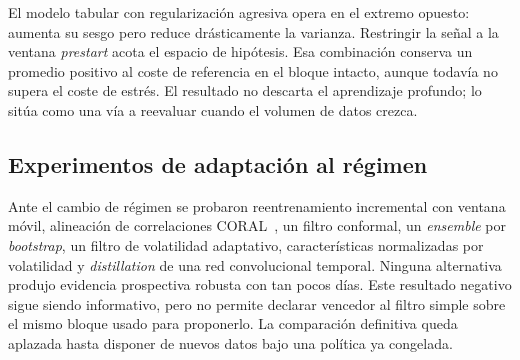 El modelo tabular con regularización agresiva opera en el extremo opuesto: aumenta su sesgo
pero reduce drásticamente la varianza. Restringir la señal a la ventana \emph{prestart} acota
el espacio de hipótesis. Esa combinación conserva un promedio positivo al coste de referencia
en el bloque intacto, aunque todavía no supera el coste de estrés. El resultado no descarta el
aprendizaje profundo; lo sitúa como una vía a reevaluar cuando el volumen de datos crezca.

\subsection{Experimentos de adaptación al régimen}

Ante el cambio de régimen se probaron reentrenamiento incremental con ventana móvil,
alineación de correlaciones CORAL~\cite{sun2016coral}, un filtro conformal, un
\emph{ensemble} por \emph{bootstrap}, un filtro de volatilidad adaptativo, características
normalizadas por volatilidad y \emph{distillation} de una red convolucional temporal.
Ninguna alternativa produjo evidencia prospectiva robusta con tan pocos días. Este resultado
negativo sigue siendo informativo, pero no permite declarar vencedor al filtro simple sobre
el mismo bloque usado para proponerlo. La comparación definitiva queda aplazada hasta disponer
de nuevos datos bajo una política ya congelada.
